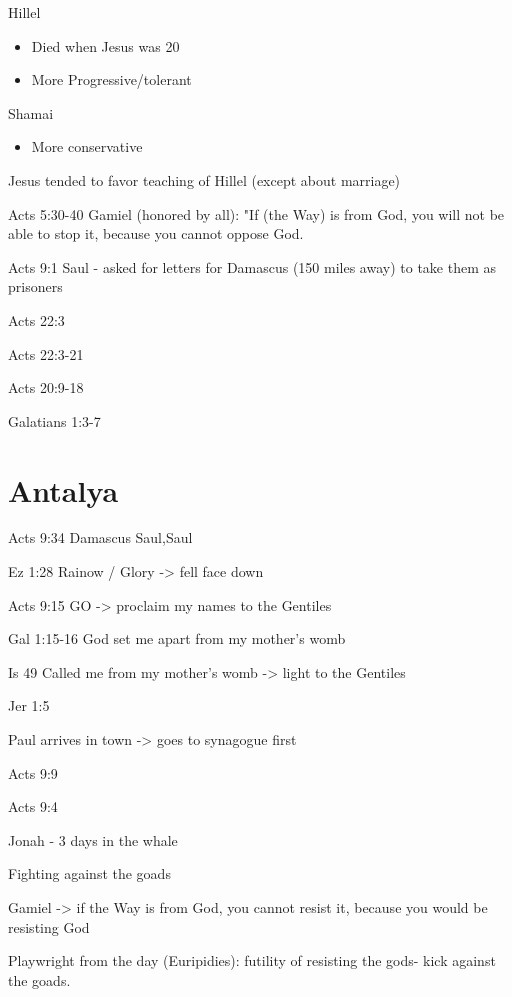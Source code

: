 \documentclass[
]{book}
\providecommand{\tightlist}{%
  \setlength{\itemsep}{0pt}\setlength{\parskip}{0pt}}
\begin{document}
Hillel

\begin{itemize}
\tightlist
\item
  Died when Jesus was 20
\item
  More Progressive/tolerant
\end{itemize}

Shamai

\begin{itemize}
\tightlist
\item
  More conservative
\end{itemize}

Jesus tended to favor teaching of Hillel (except about marriage)

Acts 5:30-40 Gamiel (honored by all): "If (the Way) is from God, you will not be able to stop it, because you cannot oppose God.

Acts 9:1 Saul - asked for letters for Damascus (150 miles away) to take them as prisoners

Acts 22:3

Acts 22:3-21

Acts 20:9-18

Galatians 1:3-7

\hypertarget{antalya-1}{%
\chapter{Antalya}\label{antalya-1}}

Acts 9:34 Damascus Saul,Saul

Ez 1:28 Rainow / Glory -\textgreater{} fell face down

Acts 9:15 GO -\textgreater{} proclaim my names to the Gentiles

Gal 1:15-16 God set me apart from my mother's womb

Is 49 Called me from my mother's womb -\textgreater{} light to the Gentiles

Jer 1:5

Paul arrives in town -\textgreater{} goes to synagogue first

Acts 9:9

Acts 9:4

Jonah - 3 days in the whale

Fighting against the goads

Gamiel -\textgreater{} if the Way is from God, you cannot resist it, because you would be resisting God

Playwright from the day (Euripidies): futility of resisting the gods- kick against the goads.
\end{document}
